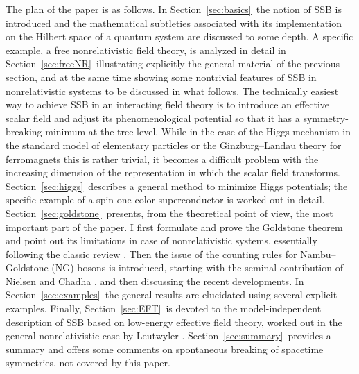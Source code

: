 \documentclass[final,2p,times,12pt,sort&compress]{elsarticle}
\begin{document}
The plan of the paper is as follows. In Section~\ref{sec:basics}\ the notion of
SSB is introduced and the mathematical subtleties associated with its
implementation on the Hilbert space of a quantum system are discussed to some
depth. A specific example, a free nonrelativistic field theory, is analyzed in
detail in Section~\ref{sec:freeNR}\ illustrating explicitly the general material
of the previous section, and at the same time showing some nontrivial features
of SSB in nonrelativistic systems to be discussed in what follows. The
technically easiest way to achieve SSB in an interacting field theory is to
introduce an effective scalar field and adjust its phenomenological potential
so that it has a symmetry-breaking minimum at the tree level. While in the case
of the Higgs mechanism in the standard model of elementary particles or the
Ginzburg--Landau theory for ferromagnets this is rather trivial, it becomes a
difficult problem with the increasing dimension of the representation in which
the scalar field transforms. Section~\ref{sec:higgs}\ describes a general method
to minimize Higgs potentials; the specific example of a spin-one color
superconductor is worked out in detail. Section~\ref{sec:goldstone}\ presents,
from the theoretical point of view, the most important part of the paper. I
first formulate and prove the Goldstone theorem and point out its limitations
in case of nonrelativistic systems, essentially following the classic review
\cite{Guralnik:1968gu}. Then the issue of the counting rules for
Nambu--Goldstone (NG) bosons is introduced, starting with the seminal
contribution of Nielsen and Chadha \cite{Nielsen:1975hm}, and then discussing
the recent developments. In Section~\ref{sec:examples}\ the general results are
elucidated using several explicit examples. Finally, Section~\ref{sec:EFT}\ is
devoted to the model-independent description of SSB based on low-energy
effective field theory, worked out in the general nonrelativistic case by
Leutwyler \cite{Leutwyler:1993gf}. Section~\ref{sec:summary}\ provides a summary
and offers some comments on spontaneous breaking of spacetime symmetries, not
covered by this paper.
\end{document}
